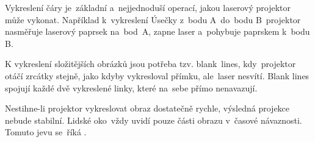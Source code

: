 Vykreslení čáry je~základní a~nejjednoduší operací, jakou laserový projektor může vykonat. Například k~vykreslení Úsečky z~bodu A~do~bodu B~projektor nasměřuje laserový paprsek na~bod~A, zapne laser a~pohybuje paprskem k~bodu B.~\cite{laser-projection}

K vykreslení složitějších obrázků jsou potřeba tzv. blank\ lines, kdy~projektor otáčí zrcátky stejně, jako kdyby vykresloval přímku, ale~laser nesvítí. Blank lines spojují každé dvě vykreslené linky, které na~sebe přímo nenavazují.~\cite{laser-projection}

Nestihne-li projektor vykreslovat obraz dostatečně rychle, výsledná projekce nebude stabilní. Lidské oko~vždy uvidí pouze části obrazu v~časové návaznosti. Tomuto jevu se~říká .~\cite{laser-projection}
